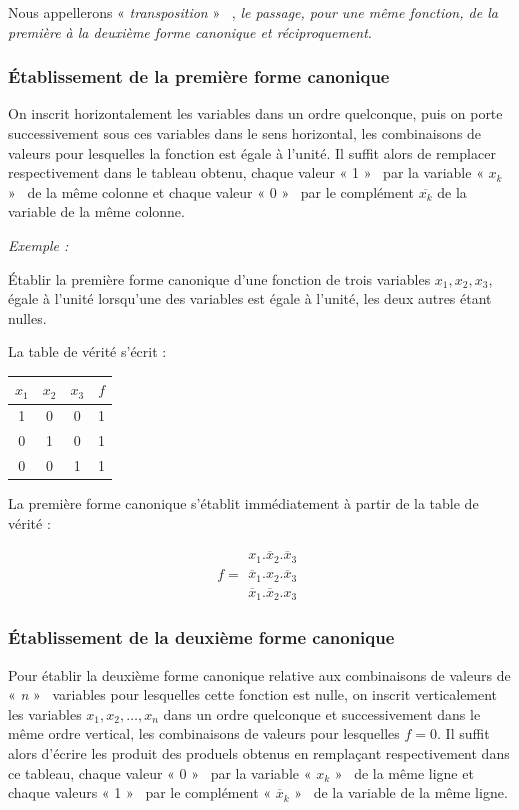 Nous appellerons « \textit{ transposition}  » \label{transposition}~,
\textit{le passage, pour une même fonction, de la première à la deuxième
forme canonique et réciproquement}.

\subsubsection{Établissement de la première forme canonique}

On inscrit horizontalement les variables dans un ordre quelconque,
puis on porte successivement sous ces variables dans le sens horizontal,
les combinaisons de valeurs pour lesquelles la fonction est égale
à l'unité. Il suffit alors de remplacer respectivement dans le tableau
obtenu, chaque valeur « 1 » ~par la variable « $x_{k}$ » ~de
la même colonne et chaque valeur « 0 » ~par le complément $\overline{x_{k}}$
de la variable de la même colonne.

\textit{Exemple :} 

Établir la première forme canonique d'une fonction de trois variables
$x_{1},x_{2},x_{3}$, égale à l'unité lorsqu'une des variables est
égale à l'unité, les deux autres étant nulles.

La table de vérité s'écrit :

\begin{center}
\begin{tabular}{|c|c|c||c|}
\hline 
$x_{1}$  & $x_{2}$  & $x_{3}$  & $f$ \tabularnewline
\hline 
1  & 0  & 0  & 1 \tabularnewline
0  & 1  & 0  & 1 \tabularnewline
0  & 0  & 1  & 1 \tabularnewline
\hline 
\end{tabular}
\end{center}

La première forme canonique s'établit immédiatement à partir de la
table de vérité :

\[
f=\begin{array}{|c|}
x_{1}.\overline{x}_{2}.\overline{x}_{3}\\
\overline{x}_{1}.x_{2}.\overline{x}_{3}\\
\overline{x}_{1}.\overline{x}_{2}.x_{3}
\end{array}
\]


\subsubsection{Établissement de la deuxième forme canonique}

Pour établir la deuxième forme canonique relative aux combinaisons
de valeurs de « \textit{n} » ~variables pour lesquelles cette fonction
est nulle, on inscrit verticalement les variables $x_{1},x_{2},\ldots,x_{n}$
dans un ordre quelconque et successivement dans le même ordre vertical,
les combinaisons de valeurs pour lesquelles $f=0$. Il suffit alors
d'écrire les produit des produels obtenus en remplaçant respectivement
dans ce tableau, chaque valeur « 0 » ~par la variable « $x_{k}$ » \-~de
la même ligne et chaque valeurs « 1 » \-~par le complément « $\overline{x}_{k}$ » \-~de
la variable de la même ligne.

